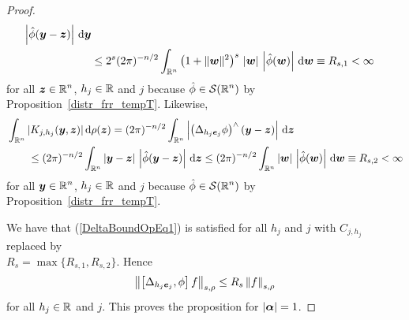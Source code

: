 \begin{proof}
\begin{align*}
\left|\hat{\phi}({\bm{y}} -{\bm{z}})\right| \,\mathrm{d}{{\bm{y}}} \\
&\leq 2^s (2\pi)^{-n/2} \int_{\mathbb{R}^n} \left(1+\|{\bm{w}}\|^2\right)^{s}
\, |{\bm{w}}| \, \left|\hat{\phi}({\bm{w}})\right|\,\mathrm{d}{{\bm{w}}}
\equiv R_{s,1} < \infty
\end{align*}
for all $\displaystyle {\bm{z}}\in \mathbb{R}^n$, $h_j \in \mathbb{R}$ and $j$
because $\displaystyle \hat{\phi} \in \mathcal{S}(\mathbb{R}^n)$ by
Proposition~\ref{distr_frr_tempT}.  Likewise,
\begin{align*}
&\int_{\mathbb{R}^n} |K_{j,h_j}({\bm{y}}, {\bm{z}})| \,\mathrm{d}{\rho({\bm{z}})}
= (2\pi)^{-n/2}\int_{\mathbb{R}^n} \left| \left(\Delta_{h_j{\bm{e}}_j} \phi\right)^\wedge
({\bm{y}} - {\bm{z}})\right|\,\mathrm{d}{{\bm{z}}} \\
&\qquad \leq (2\pi)^{-n/2} \int_{\mathbb{R}^n} |{\bm{y}}-{\bm{z}}|\,
\left|\hat{\phi}({\bm{y}} -{\bm{z}}) \right|\,\mathrm{d}{{\bm{z}}}
\leq  (2\pi)^{-n/2}\int_{\mathbb{R}^n} |{\bm{w}}|\,
\left|\hat{\phi}({\bm{w}})\right|\,\mathrm{d}{{\bm{w}}} \equiv R_{s,2} < \infty
\end{align*}
for all $\displaystyle {\bm{y}}\in \mathbb{R}^n$, $h_j \in \mathbb{R}$ and $j$  because
$\displaystyle \hat{\phi} \in \mathcal{S}(\mathbb{R}^n)$ by Proposition~\ref{distr_frr_tempT}.

We have that (\ref{DeltaBoundOpEq1}) is satisfied for all $h_j$ and
$j$ with $C_{j,h_j}$ replaced by\\
$R_s = \max\{R_{s,1},R_{s,2}\}$.  Hence
\begin{equation} \label{DeltaBoundOpEq2}
\left\| \left[ \Delta_{h_j{\bm{e}}_j} ,\phi \right] f \right\|_{s,\rho}
\leq R_s \left\| f \right\|_{s,\rho}
\end{equation}
for all $h_j \in \mathbb{R}$ and $j$.  This proves the proposition for
$|{\bm{\alpha}}|=1$.


\end{proof}
